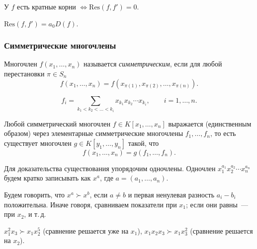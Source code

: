 \documentclass[12pt]{article}
\begin{document}
    \begin{statement}
    	У $f$ есть кратные корни $\Leftrightarrow \mathrm{Res}(f, f') = 0$.
    \end{statement}
    
    \begin{statement}
    	$\mathrm{Res}(f, f') = a_0 D(f)$.
    \end{statement}
    
    \subsubsection{Симметрические многочлены}

    \begin{definition}
    	Многочлен $f(x_1, \dots, x_n)$ называется \textit{симметрическим}, если для любой перестановки $\pi \in S_n$
    	\[
    		f(x_1, \dots, x_n) = f(x_{\pi(1)}, x_{\pi(2)}, \dots, x_{\pi(n)}).
    	\]
    \end{definition}

    \begin{definition}
    	\[
    		f_i = \sum_{k_1 < k_2 < \dots < k_i} x_{k_1} x_{k_2} \cdots x_{k_i}, \qquad i = 1, \dots, n.
    	\]
    \end{definition}

    \begin{theorem}\label{thm:sym-main}
    	Любой симметрический многочлен $f \in K[x_1, \dots, x_n]$ выражается (единственным образом) через элементарные симметрические многочлены $f_1, \dots, f_n$, то есть существует многочлен $g \in K[y_1, \dots, y_n]$ такой, что
    	\[
    		f(x_1, \dots, x_n) = g(f_1, \dots, f_n).
    	\]
    \end{theorem}

    Для доказательства существования упорядочим одночлены. Одночлен $x_1^{a_1} x_2^{a_2} \cdots x_n^{a_n}$ будем кратко записывать как $x^a$, где $a = (a_1, \dots, a_n)$.

    \begin{definition}\label{def:lex}
    	Будем говорить, что $x^a \succ x^b$, если $a \ne b$ и первая ненулевая разность $a_i - b_i$ положительна. Иначе говоря, сравниваем показатели при $x_1$; если они равны~--- при $x_2$, и т.\,д.
    \end{definition}

    \begin{example}
    	$x_1^2 x_3 \succ x_1 x_2^5$ (сравнение решается уже на $x_1$), $x_1 x_2 x_3 \succ x_1 x_3^2$ (сравнение решается на $x_2$).
    \end{example}
\end{document}
